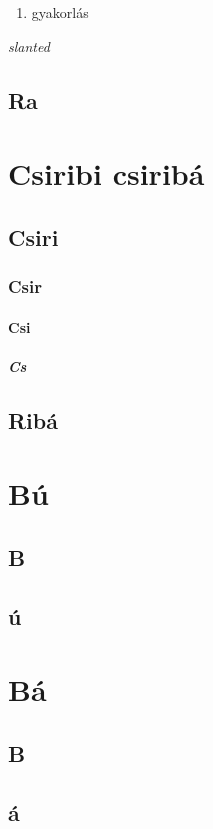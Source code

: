 \documentclass[twoside, twocolumn, 12pt]{article}
\begin{document}
\hulipsum [1-3]

\begin{enumerate}[resume]
\item gyakorlás
\end{enumerate}

\hulipsum [1-3]

\begin{description}[style=multiline]
\item
\item \textit{slanted}
\item \hulipsum[1]
\end{description}

\hulipsum [1-3]
\subsection{Ra}
\hulipsum
\section[Csiri]{Csiribi csiribá}
\subsection{Csiri}
\hulipsum[3]
\hulipsum [1-3]
\hulipsum [1-3]
\subsubsection{Csir}
\hulipsum[1]
\paragraph{Csi}
\hulipsum[4]
\subparagraph{Cs}
\hulipsum[5]
\subsection{Ribá}
\hulipsum[6-7]
\appendix
\section{Bú}
\subsection{B}
\hulipsum[1]
\subsection{ú}
\hulipsum [1-3]
\hulipsum [1-3]
\hulipsum[1]
\section{Bá}
\subsection{B}

\hulipsum [1-3]
\hulipsum [1-3]
\hulipsum[1]
\subsection{á}
\hulipsum[1]
\end{document}
